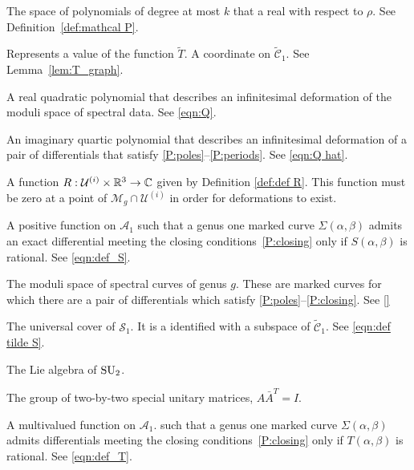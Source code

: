 \begin{description}[align=right]
\item[$\mathcal{P}^k_\R$] The space of polynomials of degree at most $k$ that a real with respect to $ρ$. See Definition~\ref{def:mathcal P}.

\item[$q$] Represents a value of the function $\tilde{T}$. A coordinate on $\mathcal{\tilde{C}}_1$. See Lemma~\ref{lem:T_graph}.

\item[$Q$] A real quadratic polynomial that describes an infinitesimal deformation of the moduli space of spectral data. See \eqref{eqn:Q}.

\item[$\hat{Q}$] An imaginary quartic polynomial that describes an infinitesimal deformation of a pair of differentials that satisfy \ref{P:poles}--\ref{P:periods}. See \eqref{eqn:Q hat}.

\item[$R$] A function $R : \mathcal{U}^{(i)} \times \R^3 \to \C$ given by Definition \ref{def:def R}. This function must be zero at a point of $\mathcal{M}_g \cap \mathcal{U}^{(i)}$ in order for deformations to exist.

\item[$S$] A positive function on $\mathcal{A}_1$ such that a genus one marked curve $Σ(α,β)$ admits an exact differential meeting the closing conditions~\ref{P:closing} only if $S(α,β)$ is rational. See \eqref{eqn:def_S}.

\item[$\mathcal{S}_g$] The moduli space of spectral curves of genus $g$. These are marked curves for which there are a pair of differentials which satisfy \ref{P:poles}--\ref{P:closing}. See \ref{}

\item[$\mathcal{\tilde{S}}_1$] The universal cover of $\mathcal{S}_1$. It is a identified with a subspace of $\mathcal{\tilde{C}}_1$. See \eqref{eqn:def tilde S}.

\item[$\su_2$] The Lie algebra of $\SU_2$.

\item[$\SU_2$] The group of two-by-two special unitary matrices, $A \bar{A}^T = I$.

\item[$T$] A multivalued function on $\mathcal{A}_1$. such that a genus one marked curve $Σ(α,β)$ admits differentials meeting the closing conditions~\ref{P:closing} only if $T(α,β)$ is rational. See \eqref{eqn:def_T}.


\end{description}
